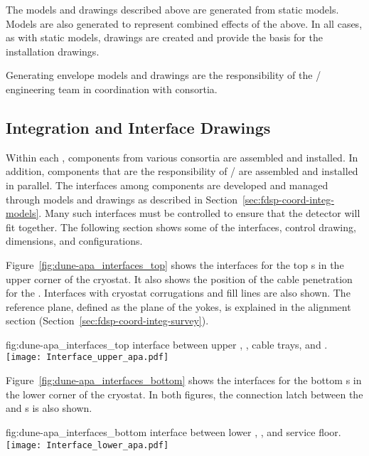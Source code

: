 The models and drawings described above are generated from static
models. Models are also generated to represent combined effects of the
above. In all cases, as with static models, \twod drawings are created
and provide the basis for the installation drawings.


Generating envelope models and drawings are the responsibility of the
/ engineering team in coordination with consortia.


\subsection{Integration and Interface Drawings}
\label{sec:fdsp-coord-integ-drawings}

Within each , components from various consortia are
assembled and installed. In addition, components that are the
responsibility of / are assembled and installed in
parallel. The interfaces among components are developed and managed
through models and drawings as described in
Section~\ref{sec:fdsp-coord-integ-models}. Many such interfaces must
be controlled to ensure that the detector will fit together. The
following section shows some of the interfaces, control drawing,
dimensions, and configurations.


Figure~\ref{fig:dune-apa_interfaces_top} shows the interfaces for the
top s in the upper corner of the cryostat. It also shows the position
of the cable penetration for the . Interfaces with cryostat
corrugations and  fill lines are also shown. The reference plane,
defined as the plane of the  yokes, is explained in the
alignment section (Section~\ref{sec:fdsp-coord-integ-survey}).
\begin{dunefigure}{fig:dune-apa_interfaces_top}
  { interface between upper , , cable
    trays, and .}
  \texttt{[image: Interface\_upper\_apa.pdf]}
\end{dunefigure}


Figure~\ref{fig:dune-apa_interfaces_bottom} shows the interfaces for
the bottom s in the lower corner of the cryostat. In both figures,
the connection latch between the  and s is also
shown.
\begin{dunefigure}{fig:dune-apa_interfaces_bottom}
  { interface between lower , , and
    service floor.}
  \texttt{[image: Interface\_lower\_apa.pdf]}
\end{dunefigure}

